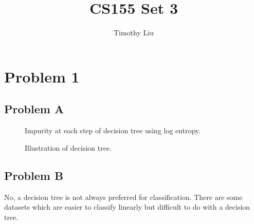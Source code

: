\documentclass[12pt]{article} %
\title{CS155 Set 3}
\author{Timothy Liu}
\begin{document}
\maketitle

\newpage

\section{Problem 1}
\subsection{Problem A}

\begin{figure}[H]
	\vspace{-10mm}
	\caption{Impurity at each step of decision tree using log entropy.}
\end{figure}

\begin{figure}[H]
	\vspace{-10mm}
	\caption{Illustration of decision tree.}
\end{figure}
\subsection{Problem B}
No, a decision tree is not always preferred for classification. There are some datasets which are easier to classify linearly but difficult to do with a decision tree.
\end{document}
